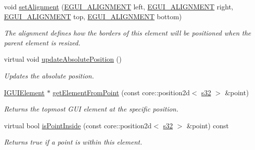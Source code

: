 \begin{DoxyCompactItemize}
void \hyperlink{classirr_1_1gui_1_1IGUIElement_a1eb3d7ec13ebbf8c73859810088f666b}{set\+Alignment} (\hyperlink{namespaceirr_1_1gui_a19eb5fb40e67f108cb16aba922ddaa2d}{E\+G\+U\+I\+\_\+\+A\+L\+I\+G\+N\+M\+E\+NT} left, \hyperlink{namespaceirr_1_1gui_a19eb5fb40e67f108cb16aba922ddaa2d}{E\+G\+U\+I\+\_\+\+A\+L\+I\+G\+N\+M\+E\+NT} right, \hyperlink{namespaceirr_1_1gui_a19eb5fb40e67f108cb16aba922ddaa2d}{E\+G\+U\+I\+\_\+\+A\+L\+I\+G\+N\+M\+E\+NT} top, \hyperlink{namespaceirr_1_1gui_a19eb5fb40e67f108cb16aba922ddaa2d}{E\+G\+U\+I\+\_\+\+A\+L\+I\+G\+N\+M\+E\+NT} bottom)
\begin{DoxyCompactList}\small\item\em The alignment defines how the borders of this element will be positioned when the parent element is resized. \end{DoxyCompactList}\item 
\mbox{\label{classirr_1_1gui_1_1IGUIElement_ad58bbeba69a118873a5075d86b4c90f2}} 
virtual void \hyperlink{classirr_1_1gui_1_1IGUIElement_ad58bbeba69a118873a5075d86b4c90f2}{update\+Absolute\+Position} ()
\begin{DoxyCompactList}\small\item\em Updates the absolute position. \end{DoxyCompactList}\item 
\hyperlink{classirr_1_1gui_1_1IGUIElement}{I\+G\+U\+I\+Element} $\ast$ \hyperlink{classirr_1_1gui_1_1IGUIElement_ae49f8a5228ce0c18e0c98becf74ee56a}{get\+Element\+From\+Point} (const core\+::position2d$<$ \hyperlink{namespaceirr_ac66849b7a6ed16e30ebede579f9b47c6}{s32} $>$ \&point)
\begin{DoxyCompactList}\small\item\em Returns the topmost G\+UI element at the specific position. \end{DoxyCompactList}\item 
virtual bool \hyperlink{classirr_1_1gui_1_1IGUIElement_a1aaf30a10b77f192dda8c548c109de89}{is\+Point\+Inside} (const core\+::position2d$<$ \hyperlink{namespaceirr_ac66849b7a6ed16e30ebede579f9b47c6}{s32} $>$ \&point) const
\begin{DoxyCompactList}\small\item\em Returns true if a point is within this element. \end{DoxyCompactList}\item 
\mbox{\label{classirr_1_1gui_1_1IGUIElement_a221c8505217aa9c23c621627a0435554}} 

\end{DoxyCompactItemize}
